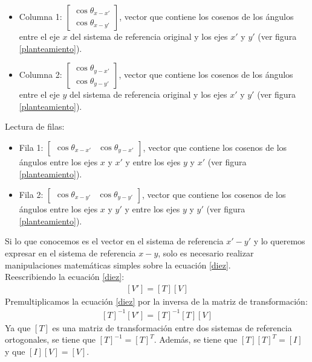 \documentclass[12pt,letterpaper]{article}
\begin{document}
\begin{itemize}
	\item Columna 1: $ \left[ \begin{array}{c}
		\cos \theta_{x-x'} \\	 \cos \theta_{x-y'}
	\end{array} \right]$, vector que contiene los cosenos de los ángulos entre el eje $x$ del sistema de referencia original y los ejes $x'$ y $y'$ (ver figura \ref{planteamiento}).
	\item Columna 2: $ \left[ \begin{array}{c}
		\cos \theta_{y-x'} \\	 \cos \theta_{y-y'}
	\end{array} \right]$, vector que contiene los cosenos de los ángulos entre el eje $y$ del sistema de referencia original y los ejes $x'$ y $y'$ (ver figura \ref{planteamiento}).
\end{itemize}
%
Lectura de filas:
%
\begin{itemize}
	\item Fila 1: $ \left[ \begin{array}{cc}
		\cos \theta_{x-x'} &	 \cos \theta_{y-x'}
	\end{array} \right]$, vector que contiene los cosenos de los ángulos entre los ejes $x$ y $x'$ y entre los ejes $y$ y $x'$ (ver figura \ref{planteamiento}).
	\item Fila 2: $ \left[ \begin{array}{cc}
		\cos \theta_{x-y'} &	 \cos \theta_{y-y'}
	\end{array} \right]$, vector que contiene los cosenos de los ángulos entre los ejes $x$ y $y'$ y entre los ejes $y$ y $y'$ (ver figura \ref{planteamiento}).
\end{itemize}
%
Si lo que conocemos es el vector en el sistema de referencia $x'-y'$ y lo queremos expresar en el sistema de referencia $x-y$, solo es necesario realizar manipulaciones matemáticas simples sobre la ecuación \ref{diez}.\\
%
Reescribiendo la ecuación \ref{diez}:
%
\begin{align*}
	\left[ V' \right] = \left[ T \right] \left[ V \right]
\end{align*}
%
Premultiplicamos la ecuación \ref{diez} por la inversa de la matriz de transformación:
%
\begin{align*}
	\left[ T \right]^{-1} \left[ V' \right] = \left[ T \right]^{-1} \left[ T \right] \left[ V \right]
\end{align*}
%
Ya que $\left[ T \right]$ es una matriz de transformación entre dos sistemas de referencia ortogonales, se tiene que $\left[ T \right]^{-1} = \left[ T \right]^T$. Además, se tiene que $\left[ T \right] \left[ T \right]^T = \left[ I \right]$ y que $\left[ I \right] \left[ V \right] = \left[ V \right]$.
\end{document}

